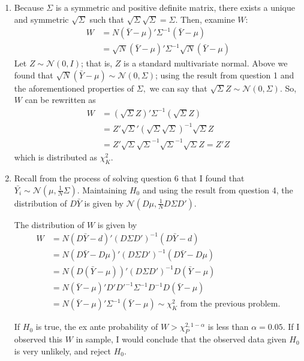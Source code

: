 \documentclass{article}[12pt]
\begin{document}
\begin{enumerate}
	\item Because $\Sigma$ is a symmetric and positive definite matrix, there exists a unique and symmetric $\sqrt{\Sigma}$ such that $\sqrt{\Sigma}\sqrt{\Sigma} = \Sigma$. Then, examine $W$:
	\begin{align*}
		W &= N (\bar{Y} - \mu)' \Sigma^{-1} (\bar{Y} - \mu) \\
		&= \sqrt{N} (\bar{Y} - \mu)' \Sigma^{-1} \sqrt{N} (\bar{Y} - \mu)
	\end{align*}
	Let $Z \sim \mathscr{N}(0,I)$; that is, $Z$ is a standard multivariate normal. Above we found that $\sqrt{N} (\bar{Y} - \mu) \sim \mathscr{N}(0,\Sigma)$; using the result from question 1 and the aforementioned properties of $\Sigma,$ we can say that $\sqrt{\Sigma} Z \sim \mathscr{N}(0,\Sigma)$. So, $W$ can be rewritten as
	\begin{align*}
		W &= (\sqrt{\Sigma} Z)' \Sigma^{-1} (\sqrt{\Sigma} Z) \\
		&= Z'\sqrt{\Sigma}' (\sqrt{\Sigma}\sqrt{\Sigma})^{-1} \sqrt{\Sigma} Z \\
		&= Z'\sqrt{\Sigma} \sqrt{\Sigma}^{-1} \sqrt{\Sigma}^{-1} \sqrt{\Sigma} Z = Z' Z
	\end{align*}
	which is distributed as $\chi^2_{K}$.

	\item Recall from the process of solving question 6 that I found that $\bar{Y_i} \sim \mathscr{N}(\mu,\frac{1}{N}\Sigma)$. Maintaining $H_0$ and using the result from question 4, the distribution of $D\bar{Y}$ is given by $\mathscr{N}(D\mu, \frac{1}{N} D\Sigma D')$.

	The distribution of $W$ is given by 
	\begin{align*}
		W &= N (D \bar{Y} - d)' (D\Sigma D')^{-1} (D\bar{Y} - d) \\
		&= N (D \bar{Y} - D\mu)' (D\Sigma D')^{-1} (D\bar{Y} - D\mu) \\
		&= N (D(\bar{Y} - \mu))' (D\Sigma D')^{-1} D(\bar{Y} - \mu) \\
		&= N (\bar{Y} - \mu)' D' D'^{-1} \Sigma^{-1} D^{-1} D(\bar{Y} - \mu) \\
		&= N (\bar{Y} - \mu)' \Sigma^{-1} (\bar{Y} - \mu) \sim \chi^2_K \mbox{ from the previous problem.}
	\end{align*}

	If $H_0$ is true, the ex ante probability of $W > \chi_P^{2, 1-\alpha}$ is less than $\alpha = 0.05$. If I observed this $W$ in sample, I would conclude that the observed data given $H_0$ is very unlikely, and reject $H_0$.

	\end{enumerate}
\end{document}
